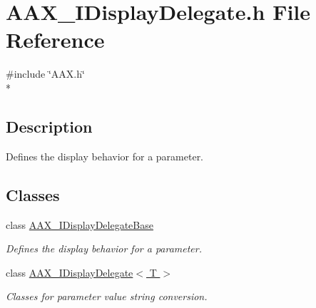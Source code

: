 \hypertarget{a00241}{}\section{A\+A\+X\+\_\+\+I\+Display\+Delegate.\+h File Reference}
\label{a00241}
{\ttfamily \#include \char`\"{}A\+A\+X.\+h\char`\"{}}\\*


\subsection{Description}
Defines the display behavior for a parameter. 

\subsection*{Classes}
\begin{DoxyCompactItemize}
\item 
class \hyperlink{a00093}{A\+A\+X\+\_\+\+I\+Display\+Delegate\+Base}
\begin{DoxyCompactList}\small\item\em Defines the display behavior for a parameter. \end{DoxyCompactList}\item 
class \hyperlink{a00092}{A\+A\+X\+\_\+\+I\+Display\+Delegate$<$ T $>$}
\begin{DoxyCompactList}\small\item\em Classes for parameter value string conversion. \end{DoxyCompactList}\end{DoxyCompactItemize}
